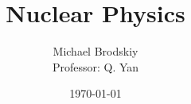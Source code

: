 


\title{Nuclear Physics}
\date{\today}
\author{Michael Brodskiy\\ \small Professor: Q. Yan}



\maketitle

\newpage

\tableofcontents

\newpage

